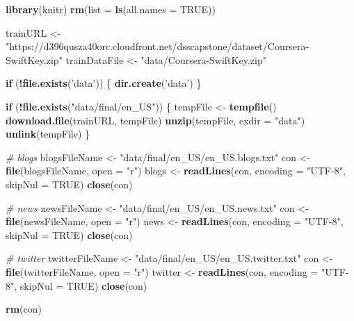 \documentclass[
]{article}
\newenvironment{Shaded}{\begin{snugshade}}{\end{snugshade}}
\newcommand{\CommentTok}[1]{\textcolor[rgb]{0.56,0.35,0.01}{\textit{#1}}}
\newcommand{\ControlFlowTok}[1]{\textcolor[rgb]{0.13,0.29,0.53}{\textbf{#1}}}
\newcommand{\DataTypeTok}[1]{\textcolor[rgb]{0.13,0.29,0.53}{#1}}
\newcommand{\KeywordTok}[1]{\textcolor[rgb]{0.13,0.29,0.53}{\textbf{#1}}}
\newcommand{\NormalTok}[1]{#1}
\newcommand{\OperatorTok}[1]{\textcolor[rgb]{0.81,0.36,0.00}{\textbf{#1}}}
\newcommand{\OtherTok}[1]{\textcolor[rgb]{0.56,0.35,0.01}{#1}}
\newcommand{\StringTok}[1]{\textcolor[rgb]{0.31,0.60,0.02}{#1}}
\begin{document}
\begin{Shaded}
\begin{Highlighting}[]
\KeywordTok{library}\NormalTok{(knitr)}
\KeywordTok{rm}\NormalTok{(}\DataTypeTok{list =} \KeywordTok{ls}\NormalTok{(}\DataTypeTok{all.names =} \OtherTok{TRUE}\NormalTok{))}



\NormalTok{trainURL <-}\StringTok{ "https://d396qusza40orc.cloudfront.net/dsscapstone/dataset/Coursera-SwiftKey.zip"}
\NormalTok{trainDataFile <-}\StringTok{ "data/Coursera-SwiftKey.zip"}

\ControlFlowTok{if}\NormalTok{ (}\OperatorTok{!}\KeywordTok{file.exists}\NormalTok{(}\StringTok{'data'}\NormalTok{)) \{}
    \KeywordTok{dir.create}\NormalTok{(}\StringTok{'data'}\NormalTok{)}
\NormalTok{\}}

\ControlFlowTok{if}\NormalTok{ (}\OperatorTok{!}\KeywordTok{file.exists}\NormalTok{(}\StringTok{"data/final/en_US"}\NormalTok{)) \{}
\NormalTok{    tempFile <-}\StringTok{ }\KeywordTok{tempfile}\NormalTok{()}
    \KeywordTok{download.file}\NormalTok{(trainURL, tempFile)}
    \KeywordTok{unzip}\NormalTok{(tempFile, }\DataTypeTok{exdir =} \StringTok{"data"}\NormalTok{)}
    \KeywordTok{unlink}\NormalTok{(tempFile)}
\NormalTok{\}}

\CommentTok{# blogs}
\NormalTok{blogsFileName <-}\StringTok{ "data/final/en_US/en_US.blogs.txt"}
\NormalTok{con <-}\StringTok{ }\KeywordTok{file}\NormalTok{(blogsFileName, }\DataTypeTok{open =} \StringTok{"r"}\NormalTok{)}
\NormalTok{blogs <-}\StringTok{ }\KeywordTok{readLines}\NormalTok{(con, }\DataTypeTok{encoding =} \StringTok{"UTF-8"}\NormalTok{, }\DataTypeTok{skipNul =} \OtherTok{TRUE}\NormalTok{)}
\KeywordTok{close}\NormalTok{(con)}

\CommentTok{# news}
\NormalTok{newsFileName <-}\StringTok{ "data/final/en_US/en_US.news.txt"}
\NormalTok{con <-}\StringTok{ }\KeywordTok{file}\NormalTok{(newsFileName, }\DataTypeTok{open =} \StringTok{"r"}\NormalTok{)}
\NormalTok{news <-}\StringTok{ }\KeywordTok{readLines}\NormalTok{(con, }\DataTypeTok{encoding =} \StringTok{"UTF-8"}\NormalTok{, }\DataTypeTok{skipNul =} \OtherTok{TRUE}\NormalTok{)}
\KeywordTok{close}\NormalTok{(con)}

\CommentTok{# twitter}
\NormalTok{twitterFileName <-}\StringTok{ "data/final/en_US/en_US.twitter.txt"}
\NormalTok{con <-}\StringTok{ }\KeywordTok{file}\NormalTok{(twitterFileName, }\DataTypeTok{open =} \StringTok{"r"}\NormalTok{)}
\NormalTok{twitter <-}\StringTok{ }\KeywordTok{readLines}\NormalTok{(con, }\DataTypeTok{encoding =} \StringTok{"UTF-8"}\NormalTok{, }\DataTypeTok{skipNul =} \OtherTok{TRUE}\NormalTok{)}
\KeywordTok{close}\NormalTok{(con)}

\KeywordTok{rm}\NormalTok{(con)}
\end{Highlighting}
\end{Shaded}
\end{document}
